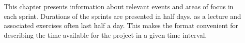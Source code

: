 This chapter presents information about relevant events and areas of focus in each sprint. 
Durations of the sprints are presented in half days, as a lecture and associated exercises often last half a day. 
This makes the format convenient for describing the time available for the project in a given time interval. 
